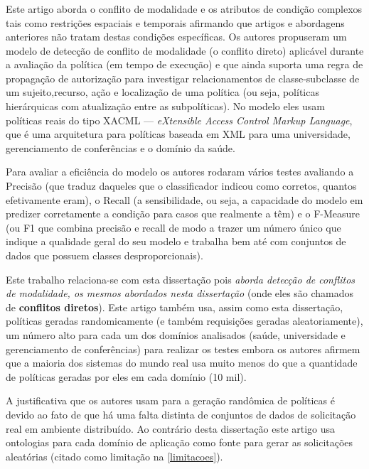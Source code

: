 \subsubsection{\cite{kuang_modality_2020} }
Este artigo aborda o conflito de modalidade e os atributos de condição complexos tais como restrições espaciais e temporais afirmando que artigos e abordagens anteriores não tratam destas condições específicas. Os autores propuseram um modelo de detecção de conflito de modalidade (o conflito direto) aplicável durante a avaliação da política (em tempo de execução) e que ainda suporta uma regra de propagação de autorização para investigar relacionamentos de classe-subclasse de um sujeito,recurso, ação e localização de uma política (ou seja, políticas hierárquicas com atualização entre as subpolíticas). No modelo eles usam políticas reais do tipo XACML --- \textit{eXtensible Access Control Markup Language}, que é uma arquitetura para políticas baseada em XML  para uma universidade, gerenciamento de conferências e o domínio da saúde. 

Para avaliar a eficiência do modelo os autores rodaram vários testes avaliando a Precisão (que traduz daqueles que o classificador indicou como corretos, quantos efetivamente eram), o Recall (a sensibilidade, ou seja, a capacidade do modelo em predizer corretamente a condição para casos que realmente a têm) e o F-Measure (ou F1 que combina precisão e recall de modo a trazer um número único que indique a qualidade geral do seu modelo e trabalha bem até com conjuntos de dados que possuem classes desproporcionais). 

Este trabalho relaciona-se com esta dissertação pois \textit{aborda detecção de conflitos de modalidade, os mesmos abordados nesta dissertação} (onde eles são chamados de\textbf{ conflitos diretos}). Este artigo também usa, assim como esta dissertação, políticas geradas randomicamente (e também requisições geradas aleatoriamente), um número alto para cada um dos domínios analisados (saúde, universidade e gerenciamento de conferências) para realizar os testes embora os autores afirmem que a maioria dos sistemas do mundo real usa muito menos do que a quantidade de políticas geradas por eles em cada domínio (10 mil). 

A justificativa que os autores usam para a geração randômica de políticas é devido ao fato de que há uma falta distinta de conjuntos de dados de solicitação real em ambiente distribuído. Ao contrário desta dissertação este artigo usa ontologias para cada domínio de aplicação como fonte para gerar as solicitações aleatórias (citado como limitação na \autoref{limitacoes}). 

